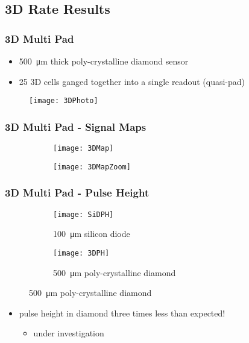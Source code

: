 
\subsection{3D Rate Results}
\begin{frame}
	\frametitle{3D Multi Pad}
	\begin{itemize}
		\item \SI{500}{\micro\meter} thick poly-crystalline diamond sensor
		\item 25 3D cells ganged together into a single readout (quasi-pad)
	\end{itemize}
	\begin{figure}
		\centering
		\texttt{[image: 3DPhoto]}
	\end{figure}
\end{frame}
\begin{frame}
	\frametitle{3D Multi Pad - Signal Maps}
	\begin{figure}
		\centering
		\begin{subfigure}[t]{0.45\textwidth}
			\centering
			\texttt{[image: 3DMap]}
		\end{subfigure}
		\begin{subfigure}[t]{0.45\textwidth}
			\centering
			\texttt{[image: 3DMapZoom]}
		\end{subfigure}
	\end{figure}
\end{frame}
\begin{frame}
	\frametitle{3D Multi Pad - Pulse Height}
	\begin{figure}
		\centering
		\begin{subfigure}[t]{0.45\textwidth}
			\centering
			\texttt{[image: SiDPH]}
			\caption{\SI{100}{\micro\meter} silicon diode}
		\end{subfigure}
		\begin{subfigure}[t]{0.45\textwidth}
			\centering
			\texttt{[image: 3DPH]}
			\caption{\SI{500}{\micro\meter} poly-crystalline diamond}
		\end{subfigure}
	\end{figure}
	\begin{itemize}
		\item pulse height in diamond three times less than expected!
		\begin{itemize}
			\item under investigation
		\end{itemize}
	\end{itemize}

\end{frame}
